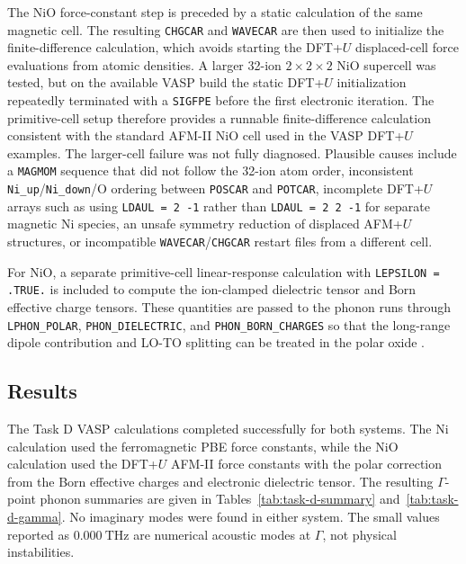 The NiO force-constant step is preceded by a static calculation of the same
magnetic cell.  The resulting \texttt{CHGCAR} and \texttt{WAVECAR} are then
used to initialize the finite-difference calculation, which avoids starting the
DFT+\(U\) displaced-cell force evaluations from atomic densities.  A larger
32-ion \(2\times2\times2\) NiO supercell was tested, but on the available VASP
build the static DFT+\(U\) initialization repeatedly terminated with a
\texttt{SIGFPE} before the first electronic iteration.  The primitive-cell setup
therefore provides a runnable finite-difference calculation consistent with the
standard AFM-II NiO cell used in the VASP DFT+\(U\) examples.
The larger-cell failure was not fully diagnosed.  Plausible causes include a
\texttt{MAGMOM} sequence that did not follow the 32-ion atom order, inconsistent
\texttt{Ni\_up}/\texttt{Ni\_down}/O ordering between \texttt{POSCAR} and
\texttt{POTCAR}, incomplete DFT+\(U\) arrays such as using
\texttt{LDAUL = 2 -1} rather than \texttt{LDAUL = 2 2 -1} for separate
magnetic Ni species, an unsafe symmetry reduction of displaced AFM+\(U\)
structures, or incompatible \texttt{WAVECAR}/\texttt{CHGCAR} restart files from
a different cell.

For NiO, a separate primitive-cell linear-response calculation with
\texttt{LEPSILON = .TRUE.} is included to compute the ion-clamped dielectric
tensor and Born effective charge tensors.  These quantities are passed to the
phonon runs through \texttt{LPHON\_POLAR}, \texttt{PHON\_DIELECTRIC}, and
\texttt{PHON\_BORN\_CHARGES} so that the long-range dipole contribution and
LO-TO splitting can be treated in the polar oxide \cite{vasp-phonon-dispersion,
vasp-lepsilon}.

\subsection{Results}

The Task D VASP calculations completed successfully for both systems.  The Ni
calculation used the ferromagnetic PBE force constants, while the NiO
calculation used the DFT+\(U\) AFM-II force constants with the polar correction
from the Born effective charges and electronic dielectric tensor.  The
resulting \(\Gamma\)-point phonon summaries are given in
Tables~\ref{tab:task-d-summary} and~\ref{tab:task-d-gamma}.  No imaginary modes
were found in either system.  The small values reported as
\(0.000~\mathrm{THz}\) are numerical acoustic modes at \(\Gamma\), not
physical instabilities.

